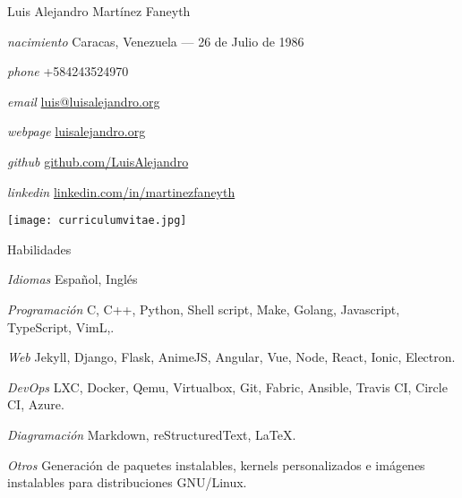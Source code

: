 \documentclass[10pt,letterpaper]{article}
\begin{document}
\begin{cv}{Luis Alejandro Mart\'inez Faneyth}
\vspace{1em}

\begin{minipage}{.7\linewidth}
\begin{cvlist}{}
\item[\textit{\large{nacimiento}}]{Caracas, Venezuela --- 26 de Julio de 1986}
\item[\textit{\large{phone}}]{+584243524970}
\item[\textit{\large{email}}]{\href{mailto:luis@luisalejandro.org}{luis@luisalejandro.org}}
\item[\textit{\large{webpage}}]{\href{http://luisalejandro.org}{luisalejandro.org}}
\item[\textit{\large{github}}]{\href{http://github.com/LuisAlejandro}{github.com/LuisAlejandro}}
\item[\textit{\large{linkedin}}]{\href{https://www.linkedin.com/in/martinezfaneyth}{linkedin.com/in/martinezfaneyth}}
\end{cvlist}
\end{minipage}
\begin{minipage}{.3\linewidth}
\texttt{[image: curriculumvitae.jpg]}
\end{minipage}
\vspace{1em}

\begin{cvlist}{Habilidades}
	\item[\textit{\large{Idiomas}}]{Espa\~nol, Ingl\'es}
	\item[\textit{\large{Programaci\'on}}]{C, C++, Python, Shell script, Make, Golang, Javascript, TypeScript, VimL,.}
	\item[\textit{\large{Web}}]{Jekyll, Django, Flask, AnimeJS, Angular, Vue, Node, React, Ionic, Electron.}
	\item[\textit{\large{DevOps}}]{LXC, Docker, Qemu, Virtualbox, Git, Fabric, Ansible, Travis CI, Circle CI, Azure.}
	\item[\textit{\large{Diagramaci\'on}}]{Markdown, reStructuredText, \LaTeX.}
	\item[\textit{\large{Otros}}]{
		Generaci\'on de paquetes instalables, kernels personalizados e im\'agenes instalables para distribuciones GNU/Linux.\\
	}
\end{cvlist}


\end{cv}
\end{document}

